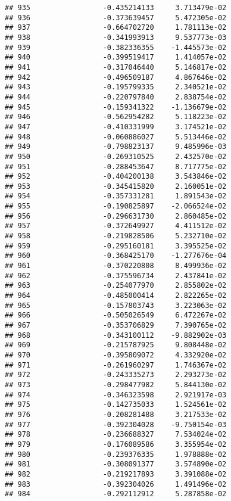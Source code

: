 \documentclass[
]{article}
\begin{document}
\begin{verbatim}
## 935                 -0.435214133     3.713479e-02
## 936                 -0.373639457     5.472305e-02
## 937                 -0.664702720     1.781113e-02
## 938                 -0.341993913     9.537773e-03
## 939                 -0.382336355    -1.445573e-02
## 940                 -0.399519417     1.414057e-02
## 941                 -0.317046440     5.146817e-02
## 942                 -0.496509187     4.867646e-02
## 943                 -0.195799335     2.340521e-02
## 944                 -0.220797840     2.838754e-02
## 945                 -0.159341322    -1.136679e-02
## 946                 -0.562954282     5.118223e-02
## 947                 -0.410331999     3.174521e-02
## 948                 -0.060886027     5.513446e-02
## 949                 -0.798823137     9.485996e-03
## 950                 -0.269310525     2.432570e-02
## 951                 -0.288453647     8.717775e-02
## 952                 -0.404200138     3.543846e-02
## 953                 -0.345415820     2.160051e-02
## 954                 -0.357331281     1.891543e-02
## 955                 -0.190825897    -2.066524e-02
## 956                 -0.296631730     2.860485e-02
## 957                 -0.372649927     4.411512e-02
## 958                 -0.219828506     5.232710e-02
## 959                 -0.295160181     3.395525e-02
## 960                 -0.368425170    -1.277676e-04
## 961                 -0.370220808     8.499936e-02
## 962                 -0.375596734     2.437841e-02
## 963                 -0.254077970     2.855802e-02
## 964                 -0.485000414     2.822265e-02
## 965                 -0.157803743     3.223063e-02
## 966                 -0.505026549     6.472267e-02
## 967                 -0.353706829     7.390765e-02
## 968                 -0.343100112    -9.882902e-03
## 969                 -0.215787925     9.808448e-02
## 970                 -0.395809072     4.332920e-02
## 971                 -0.261960297     1.746367e-02
## 972                 -0.243335273     2.293273e-02
## 973                 -0.298477982     5.844130e-02
## 974                 -0.346323598     2.921917e-03
## 975                 -0.142735033     1.524561e-02
## 976                 -0.208281488     3.217533e-02
## 977                 -0.392304028    -9.750154e-03
## 978                 -0.236688327     7.534024e-02
## 979                 -0.176089586     3.355954e-02
## 980                 -0.239376335     1.978888e-02
## 981                 -0.308091377     3.574890e-02
## 982                 -0.219217893     3.391088e-02
## 983                 -0.392304026     1.491496e-02
## 984                 -0.292112912     5.287858e-02

\end{verbatim}
\end{document}
